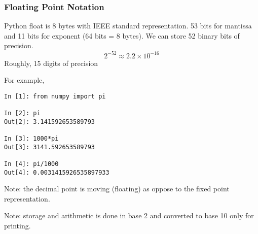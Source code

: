 \begin{frame}[fragile]

\frametitle{Floating Point  Notation}

Python float is 8 bytes with IEEE standard representation.
53 bits for mantissa and 11 bits for exponent (64 bits = 8 bytes). We can store 52 binary bits of precision.
$$
2^{-52} \approx 2.2 \times 10^{-16} 
$$
Roughly, 15 digits of precision

For example,
\begin{verbatim}
In [1]: from numpy import pi

In [2]: pi
Out[2]: 3.141592653589793

In [3]: 1000*pi
Out[3]: 3141.592653589793

In [4]: pi/1000
Out[4]: 0.0031415926535897933

\end{verbatim}

Note: the decimal point is moving (floating) as oppose to the fixed point representation.

Note:  storage and arithmetic is done in base 2 and converted to base 10 only for printing.
\end{frame}




